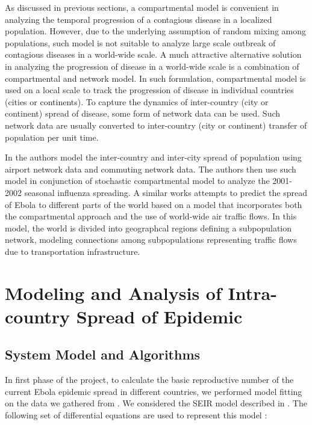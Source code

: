 \documentclass[10pt, journal,onecolumn]{IEEEtran}
\begin{document}
As discussed in previous sections, a compartmental model is convenient in analyzing the temporal
progression of a contagious disease in a localized population. However, due to the underlying
assumption of random mixing among populations, such model is not suitable to analyze large scale
outbreak of contagious diseases in a world-wide scale. A much attractive alternative solution in
analyzing the progression of disease in a world-wide scale is a combination of compartmental and
network model. In such formulation, compartmental model is used on a local scale to track the
progression of disease in individual countries (cities or continents). To capture the dynamics of
inter-country (city or continent) spread of disease, some form of network data can be used. Such
network data are usually converted to inter-country (city or continent) transfer of population per
unit time.

In \citep{balcan2010modeling} the authors model the inter-country and inter-city spread of
population using airport network data and commuting network data. The authors then use such model in
conjunction of stochastic compartmental model to analyze the  2001-2002 seasonal influenza
spreading. A similar works  \citep{gomes2014assessing}  attempts to predict the spread of Ebola to
different parts of the world based on a model that incorporates both the compartmental approach and
the use of world-wide air traffic flows. In this model, the world is divided into geographcal
regions defining a subpopulation network, modeling connections among subpopulations representing
traffic flows due to transportation infrastructure.



\section{{Modeling and Analysis of Intra-country Spread of Epidemic}}
\label{sec:IntraCountry}

\subsection{System Model and Algorithms}
In first phase of the project, to calculate the basic reproductive number of the current Ebola
epidemic spread in different countries, we performed model fitting on the data we gathered from
\citep{cmriversdata}. We considered the SEIR model described in \citep{chowell2004basic}. The
following set of differential equations are used to represent this model \citep{chowell2004basic}:
\end{document}

